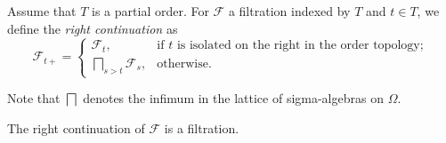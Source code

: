 \begin{definition}\label{def:rightLimitFiltration}
  \leanok
Assume that $T$ is a partial order. For $\mathcal{F}$ a filtration indexed by $T$ and $t \in T$, we define the \emph{right continuation} as
$$\mathcal{F}_{t+} =
  \begin{cases}
    \mathcal{F}_t, & \text{if $t$ is isolated on the right in the order topology}; \\
    \bigsqcap_{s > t} \mathcal{F}_s, & \text{otherwise}.
  \end{cases}
$$

Note that $\bigsqcap$ denotes the infimum in the lattice of sigma-algebras on $\Omega$.
\end{definition}

\begin{lemma}\label{lem:filtrationRightCont}
  \leanok
The right continuation of $\mathcal{F}$ is a filtration.
\end{lemma}


